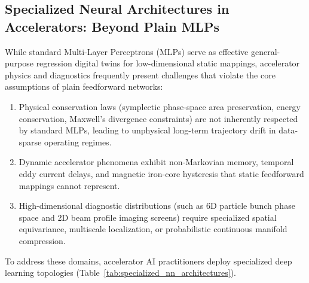 \documentclass[11pt,a4paper]{article}
\begin{document}
\subsection{Specialized Neural Architectures in Accelerators: Beyond Plain MLPs}
While standard Multi-Layer Perceptrons (MLPs) serve as effective general-purpose regression digital twins for low-dimensional static mappings, accelerator physics and diagnostics frequently present challenges that violate the core assumptions of plain feedforward networks:
\begin{enumerate}
    \item Physical conservation laws (symplectic phase-space area preservation, energy conservation, Maxwell's divergence constraints) are not inherently respected by standard MLPs, leading to unphysical long-term trajectory drift in data-sparse operating regimes.
    \item Dynamic accelerator phenomena exhibit non-Markovian memory, temporal eddy current delays, and magnetic iron-core hysteresis that static feedforward mappings cannot represent.
    \item High-dimensional diagnostic distributions (such as 6D particle bunch phase space and 2D beam profile imaging screens) require specialized spatial equivariance, multiscale localization, or probabilistic continuous manifold compression.
\end{enumerate}
To address these domains, accelerator AI practitioners deploy specialized deep learning topologies (Table~\ref{tab:specialized_nn_architectures}).
\end{document}
